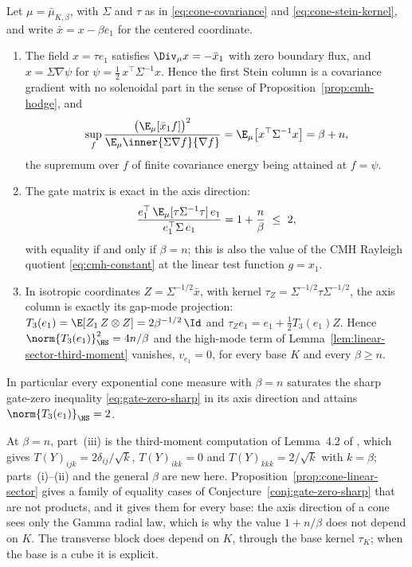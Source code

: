 \documentclass[../../main.tex]{subfiles}
\begin{document}
\begin{proposition}
\label{prop:cone-linear-sector}
Let $\mu=\bar\mu_{K,\beta}$, with $\Sigma$ and $\tau$ as in \eqref{eq:cone-covariance} and
\eqref{eq:cone-stein-kernel}, and write $\bar x=x-\beta e_1$ for the centered coordinate.
\begin{enumerate}[label=(\roman*),leftmargin=2.8em]
  \item The field $x=\tau e_1$ satisfies $\Div_\mu x=-\bar x_1$ with zero boundary flux, and
  $x=\Sigma\nabla\psi$ for $\psi=\tfrac12\,x^\top\Sigma^{-1}x$. Hence the first Stein column
  is a covariance gradient with no solenoidal part in the sense of
  Proposition~\ref{prop:cmh-hodge}, and
  \[
    \sup_{f}\frac{\bigl(\E_\mu[\bar x_1f]\bigr)^2}{\E_\mu\inner{\Sigma\nabla f}{\nabla f}}
    =\E_\mu\bigl[x^\top\Sigma^{-1}x\bigr]=\beta+n,
  \]
  the supremum over $f$ of finite covariance energy being attained at $f=\psi$.
  \item The gate matrix is exact in the axis direction:
  \[
    \frac{e_1^\top\,\E_\mu[\tau\Sigma^{-1}\tau]\,e_1}{e_1^\top\Sigma\,e_1}
    =1+\frac n\beta\ \le\ 2,
  \]
  with equality if and only if $\beta=n$; this is also the value of the CMH Rayleigh quotient
  \eqref{eq:cmh-constant} at the linear test function $g=x_1$.
  \item In isotropic coordinates $Z=\Sigma^{-1/2}\bar x$, with kernel
  $\tau_Z=\Sigma^{-1/2}\tau\Sigma^{-1/2}$, the axis column is exactly its gap-mode projection:
  $T_3(e_1)=\E[Z_1\,Z\otimes Z]=2\beta^{-1/2}\,\Id$ and
  $\tau_Ze_1=e_1+\tfrac12T_3(e_1)Z$. Hence $\norm{T_3(e_1)}_{\HS}^2=4n/\beta$ and the
  high-mode term of Lemma~\ref{lem:linear-sector-third-moment} vanishes, $v_{e_1}=0$, for every
  base $K$ and every $\beta\ge n$.
\end{enumerate}
In particular every exponential cone measure with $\beta=n$ saturates the sharp gate-zero
inequality \eqref{eq:gate-zero-sharp} in its axis direction and attains
$\norm{T_3(e_1)}_{\HS}=2$.
\end{proposition}

At $\beta=n$, part~(iii) is the third-moment computation of Lemma~4.2 of
\cite{ChenKlartag2026SharpThinShell}, which gives $T(Y)_{ijk}=2\delta_{ij}/\sqrt k$,
$T(Y)_{ikk}=0$ and $T(Y)_{kkk}=2/\sqrt k$ with $k=\beta$; parts~(i)--(ii) and the general
$\beta$ are new here.
Proposition~\ref{prop:cone-linear-sector} gives a family of equality cases of
Conjecture~\ref{conj:gate-zero-sharp} that are not products, and it gives them for every base:
the axis direction of a cone sees only the Gamma radial law, which is why the value $1+n/\beta$
does not depend on $K$. The transverse block does depend on $K$, through the base kernel
$\tau_K$; when the base is a cube it is explicit.
\end{document}
